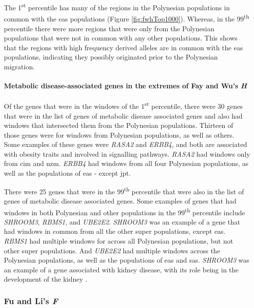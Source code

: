 \documentclass[twoside,openright]{report}
\let\oldparagraph\paragraph
\renewcommand{\paragraph}[1]{\oldparagraph{#1}\mbox{}}
\begin{document}
The 1\textsuperscript{st} percentile has many of the regions in the
Polynesian populations in common with the \gls{eas} populations (Figure
\ref{fig:fwhTop1000}). Whereas, in the 99\textsuperscript{th} percentile
there were more regions that were only from the Polynesian populations
that were not in common with any other populations. This shows that the
regions with high frequency derived alleles are in common with the
\gls{eas} populations, indicating they possibly originated prior to the
Polynesian migration.

\paragraph{\texorpdfstring{Metabolic disease-associated genes in the
extremes of Fay and Wu's
\emph{H}}{Metabolic disease-associated genes in the extremes of Fay and Wu's H}}\label{metabolic-disease-associated-genes-in-the-extremes-of-fay-and-wus-h}

Of the genes that were in the windows of the 1\textsuperscript{st}
percentile, there were 30 genes that were in the list of genes of
metabolic disease associated genes and also had windows that intersected
them from the Polynesian populations. Thirteen of those genes were for
windows from Polynesian populations, as well as others. Some examples of
these genes were \emph{RASA2} and \emph{ERBB4}, and both are associated
with obesity traits and involved in signalling pathways. \emph{RASA2}
had windows only from \gls{cim} and \gls{nzm}. \emph{ERBB4} had windows
from all four Polynesian populations, as well as the populations of
\gls{eas} - except \gls{jpt}.

There were 25 genes that were in the 99\textsuperscript{th} percentile
that were also in the list of genes of metabolic disease associated
genes. Some examples of genes that had windows in both Polynesian and
other populations in the 99\textsuperscript{th} percentile include
\emph{SHROOM3}, \emph{RBMS1}, and \emph{UBE2E2}. \emph{SHROOM3} was an
example of a gene that had windows in common from all the other super
populations, except \gls{eas}. \emph{RBMS1} had multiple windows for
across all Polynesian populations, but not other super populations. And
\emph{UBE2E2} had multiple windows across the Polynesian populations, as
well as the populations of \gls{eas} and \gls{sas}. \emph{SHROOM3} was
an example of a gene associated with kidney disease, with its role being
in the development of the kidney \citep{Khalili2016}.

\subsubsection{\texorpdfstring{Fu and Li's
\emph{F}}{Fu and Li's F}}\label{fu-and-lis-f-1}
\end{document}
